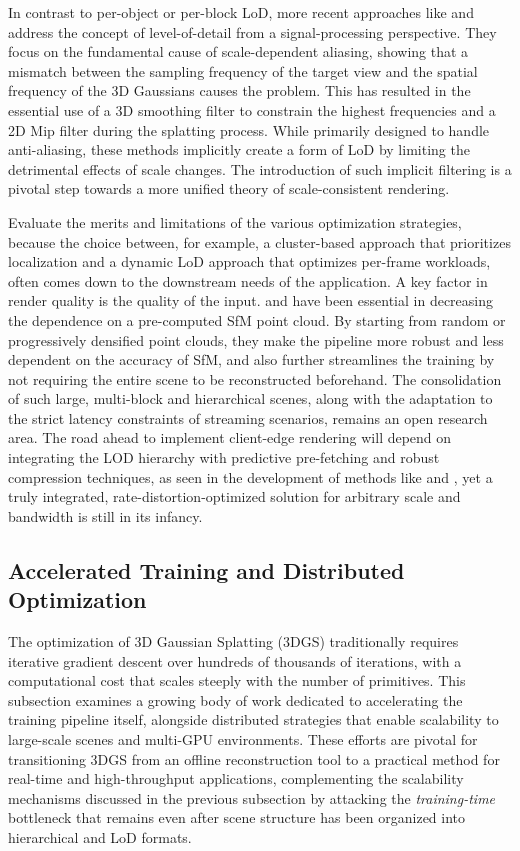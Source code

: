 \documentclass[11pt,a4paper]{article}
\begin{document}
In contrast to per-object or per-block LoD, more recent approaches like \cite{arxiv:2311.16493v1} and \cite{arxiv:2403.19615v1} address the concept of level-of-detail from a signal-processing perspective. They focus on the fundamental cause of scale-dependent aliasing, \cite{arxiv:2311.16493v1} showing that a mismatch between the sampling frequency of the target view and the spatial frequency of the 3D Gaussians causes the problem. This has resulted in the essential use of a 3D smoothing filter to constrain the highest frequencies and a 2D Mip filter during the splatting process. While primarily designed to handle anti-aliasing, these methods implicitly create a form of LoD by limiting the detrimental effects of scale changes. The introduction of such implicit filtering is a pivotal step towards a more unified theory of scale-consistent rendering.

Evaluate the merits and limitations of the various optimization strategies, because the choice between, for example, a cluster-based approach that prioritizes localization and a dynamic LoD approach that optimizes per-frame workloads, often comes down to the downstream needs of the application. A key factor in render quality is the quality of the input. \cite{arxiv:2312.07504v1} and \cite{arxiv:2402.14650v1} have been essential in decreasing the dependence on a pre-computed SfM point cloud. By starting from random or progressively densified point clouds, they make the pipeline more robust and less dependent on the accuracy of SfM, and also further streamlines the training by not requiring the entire scene to be reconstructed beforehand. The consolidation of such large, multi-block and hierarchical scenes, along with the adaptation to the strict latency constraints of streaming scenarios, remains an open research area. The road ahead to implement client-edge rendering will depend on integrating the LOD hierarchy with predictive pre-fetching and robust compression techniques, as seen in the development of methods like \cite{arxiv:2406.12080v1} and \cite{arxiv:2401.02436v2}, yet a truly integrated, rate-distortion-optimized solution for arbitrary scale and bandwidth is still in its infancy.


\subsection{Accelerated Training and Distributed Optimization}


The optimization of 3D Gaussian Splatting (3DGS) traditionally requires iterative gradient descent over hundreds of thousands of iterations, with a computational cost that scales steeply with the number of primitives. This subsection examines a growing body of work dedicated to accelerating the training pipeline itself, alongside distributed strategies that enable scalability to large-scale scenes and multi-GPU environments. These efforts are pivotal for transitioning 3DGS from an offline reconstruction tool to a practical method for real-time and high-throughput applications, complementing the scalability mechanisms discussed in the previous subsection by attacking the \emph{training-time} bottleneck that remains even after scene structure has been organized into hierarchical and LoD formats.
\end{document}

